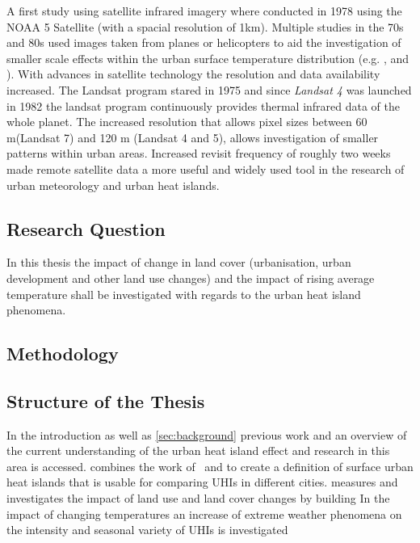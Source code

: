 \documentclass[a4paper, english]{article}
\begin{document}
  A first study using satellite infrared imagery where conducted in 1978 using the NOAA 5 Satellite (with a spacial resolution of 1km)\cite{Matson1978}. 
  Multiple studies in the 70s and 80s used images taken from planes or helicopters to aid the investigation of smaller scale effects within the urban surface temperature distribution (e.g. \cite{Landsberg1979}, \cite{ljungberg1980use} and \cite{Foster1981}).
  With advances in satellite technology the resolution and data availability increased. 
  The Landsat program stared in 1975 and since \textit{Landsat 4} was launched in 1982 the landsat program continuously provides thermal infrared data of the whole planet. 
  The increased resolution that allows pixel sizes between 60 m(Landsat 7) and 120 m (Landsat 4 and 5), allows investigation of smaller patterns within urban areas. 
  Increased revisit frequency of roughly two weeks made remote satellite data a more useful and widely used tool in the research of urban meteorology and urban heat islands. 
  \subsection{Research Question}
  In this thesis the impact of change in land cover (urbanisation, urban development and other land use changes) and the impact of rising average temperature shall be investigated with regards to the urban heat island phenomena. 

 
    \subsection{Methodology}
    





    \subsection{Structure of the Thesis}
    In the introduction as well as \cref{sec:background} previous work and an overview of the current understanding of the urban heat island effect and research in this area is accessed. 
     combines the work of~\cite{Sobrino2020} and %
    to create a definition of surface urban heat islands that is usable for comparing \glspl{UHI} in different cities.  
     measures and investigates the impact of land use and land cover changes by building
    In  the impact of changing temperatures an increase of extreme weather phenomena on the intensity and seasonal variety of \glspl{UHI} is investigated 
\end{document}
